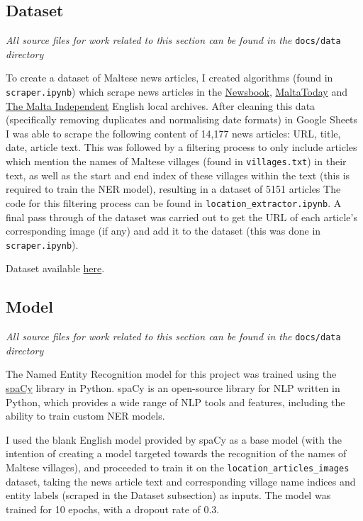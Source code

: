 \documentclass[a4paper, oneside, 11pt]{article}
\begin{document}
\begin{multicols*}{2}
  \subsection{Dataset}
  \textit{All source files for work related to this section can be found in the} \verb|docs/data| \textit{directory}

  \medskip

  To create a dataset of Maltese news articles, I created algorithms (found in \verb|scraper.ipynb|) which scrape news articles in the \href{https://newsbook.com.mt/}{Newsbook}, \href{https://www.maltatoday.com.mt/}{MaltaToday} and \href{https://www.independent.com.mt/}{The Malta Independent} English local archives. After cleaning this data (specifically removing duplicates and normalising date formats) in Google Sheets I was able to scrape the following content of 14,177 news articles: URL, title, date, article text. This was followed by a filtering process to only include articles which mention the names of Maltese villages (found in \verb|villages.txt|) in their text, as well as the start and end index of these villages within the text (this is required to train the NER model), resulting in a dataset of 5151 articles The code for this filtering process can be found in \verb|location_extractor.ipynb|. A final pass through of the dataset was carried out to get the URL of each article's corresponding image (if any) and add it to the dataset (this was done 
  in \verb|scraper.ipynb|).

  \medskip

  Dataset available \href{https://docs.google.com/spreadsheets/d/173apOv4j19tx1Dxv5G9BTqv-GNFM1slDcwCgPO2WXKY/edit?usp=sharing}{here}.

  \subsection{Model}
  \textit{All source files for work related to this section can be found in the} \verb|docs/data| \textit{directory}

  \medskip

  The Named Entity Recognition model for this project was trained using the \href{}{spaCy} library in Python. spaCy is an open-source library for NLP written in Python, which provides a wide range of NLP tools and features, including the ability to train custom NER models.

  I used the blank English model provided by spaCy as a base model (with the intention of creating a model targeted towards the recognition of the names of Maltese villages), and proceeded to train it on the \verb|location_articles_images| dataset, taking the news article text and corresponding village name indices and entity labels (scraped in the Dataset subsection) as inputs. The model was trained for 10 epochs, with a dropout rate of 0.3.


\end{multicols*}
\end{document}
